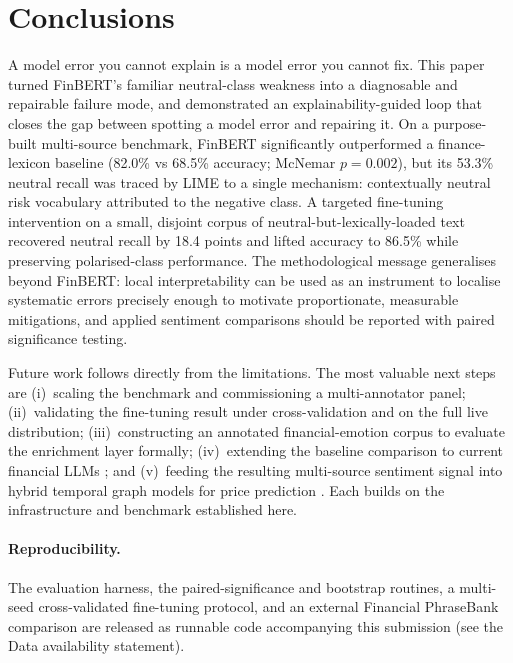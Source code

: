\documentclass{aims}
\numberwithin{equation}{section}
\begin{document}
\section{Conclusions}\label{sec:conclusion}
A model error you cannot explain is a model error you cannot fix. This paper turned
FinBERT's familiar neutral-class weakness into a diagnosable and repairable failure
mode, and demonstrated an explainability-guided loop that closes the gap between
spotting a model error and repairing it. On a purpose-built multi-source benchmark, FinBERT significantly
outperformed a finance-lexicon baseline (82.0\% vs 68.5\% accuracy; McNemar
$p = 0.002$), but its 53.3\% neutral recall was traced by LIME to a single mechanism:
contextually neutral risk vocabulary attributed to the negative class. A targeted
fine-tuning intervention on a small, disjoint corpus of neutral-but-lexically-loaded
text recovered neutral recall by 18.4 points and lifted accuracy to 86.5\% while
preserving polarised-class performance. The methodological message generalises beyond
FinBERT: local interpretability can be used as an instrument to localise systematic
errors precisely enough to motivate proportionate, measurable mitigations, and
applied sentiment comparisons should be reported with paired significance testing.

Future work follows directly from the limitations. The most valuable next steps are
(i)~scaling the benchmark and commissioning a multi-annotator panel; (ii)~validating
the fine-tuning result under cross-validation and on the full live distribution;
(iii)~constructing an annotated financial-emotion corpus to evaluate the enrichment
layer formally; (iv)~extending the baseline comparison to current financial LLMs
\citep{wu2023,fatouros2023}; and (v)~feeding the resulting multi-source sentiment
signal into hybrid temporal graph models for price prediction \citep{lynch2025}. Each builds
on the infrastructure and benchmark established here.

\paragraph{Reproducibility.}\label{sec:reprod}
The evaluation harness, the paired-significance and bootstrap routines, a multi-seed
cross-validated fine-tuning protocol, and an external Financial PhraseBank
comparison are released as runnable code accompanying this submission (see the Data
availability statement).
\end{document}
